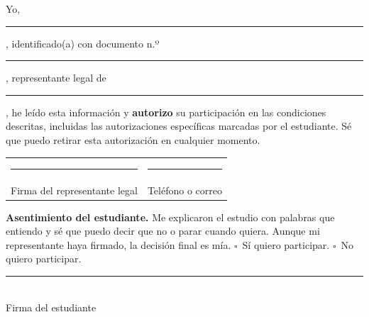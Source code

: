 \documentclass[11pt,letterpaper]{article}
\newcommand{\linea}[1][6cm]{\rule{#1}{0.4pt}}
\newcommand{\casilla}{$\square$\ }
\begin{document}
\medskip
\noindent Yo, \linea[7cm], identificado(a) con documento n.º \linea[3.5cm], representante legal de \linea[6.5cm], he leído esta información y \textbf{autorizo} su participación en las condiciones descritas, incluidas las autorizaciones específicas marcadas por el estudiante. Sé que puedo retirar esta autorización en cualquier momento.

\vspace{0.8cm}
\noindent
\begin{tabularx}{\linewidth}{@{}XX@{}}
\linea[7cm] & \linea[7cm]\\
Firma del representante legal & Teléfono o correo\\
\end{tabularx}

\medskip
\noindent\textbf{Asentimiento del estudiante.} Me explicaron el estudio con palabras que entiendo y sé que puedo decir que no o parar cuando quiera. Aunque mi representante haya firmado, la decisión final es mía. \quad \casilla Sí quiero participar. \quad \casilla No quiero participar.

\vspace{0.7cm}
\noindent\linea[7cm]\\
Firma del estudiante
\end{document}
